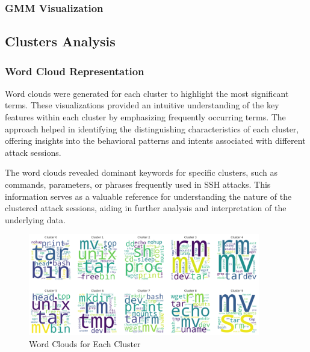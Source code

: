         

        \subsubsection{GMM Visualization \\}

        

    \subsection{Clusters Analysis}

        \subsubsection{Word Cloud Representation \\}

        Word clouds were generated for each cluster to highlight the most significant terms. These visualizations provided an intuitive understanding of the key features within each cluster by emphasizing frequently occurring terms. The approach helped in identifying the distinguishing characteristics of each cluster, offering insights into the behavioral patterns and intents associated with different attack sessions.

        The word clouds revealed dominant keywords for specific clusters, such as commands, parameters, or phrases frequently used in SSH attacks. This information serves as a valuable reference for understanding the nature of the clustered attack sessions, aiding in further analysis and interpretation of the underlying data.


            \begin{figure}[H]
                \centering
                \includegraphics[width=0.9\textwidth]{../figures/plots/section3/circular_wordclouds.png}
                \caption{Word Clouds for Each Cluster}
                \label{fig:word_clouds}
            \end{figure}

